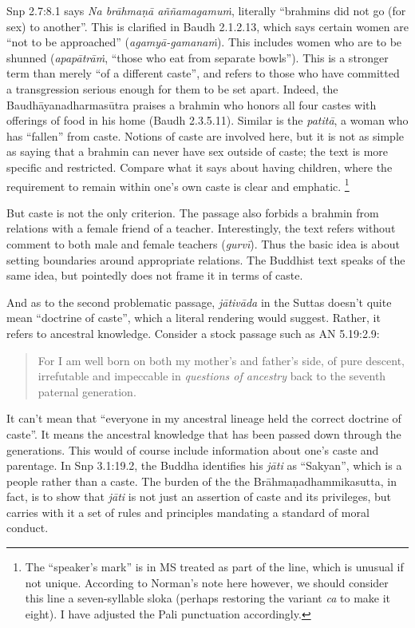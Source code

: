 \documentclass[12pt,openany]{book}%
\begin{document}
Snp 2.7:8.1 says \textit{Na \textsanskrit{brāhmaṇā} \textsanskrit{aññamagamuṁ}}, literally “brahmins did not go (for sex) to another”. This is clarified in Baudh 2.1.2.13, which says certain women are “not to be approached” (\textit{\textsanskrit{agamyā}-\textsanskrit{gamanaṁ}}). This includes women who are to be shunned (\textit{\textsanskrit{apapātrāṁ}}, “those who eat from separate bowls”). This is a stronger term than merely “of a different caste”, and refers to those who have committed a transgression serious enough for them to be set apart. Indeed, the \textsanskrit{Baudhāyanadharmasūtra} praises a brahmin who honors all four castes with offerings of food in his home (Baudh 2.3.5.11). Similar is the \textit{\textsanskrit{patitā}}, a woman who has “fallen” from caste. Notions of caste are involved here, but it is not as simple as saying that a brahmin can never have sex outside of caste; the text is more specific and restricted. Compare what it says about having children, where the requirement to remain within one’s own caste is clear and emphatic. \footnote{The “speaker’s mark” is in MS treated as part of the line, which is unusual if not unique. According to Norman’s note here however, we should consider this line a seven-syllable sloka (perhaps restoring the variant \textit{ca} to make it eight). I have adjusted the Pali punctuation accordingly. }

But caste is not the only criterion. The passage also forbids a brahmin from relations with a female friend of a teacher. Interestingly, the text refers without comment to both male and female teachers (\textit{\textsanskrit{gurvī}}). Thus the basic idea is about setting boundaries around appropriate relations. The Buddhist text speaks of the same idea, but pointedly does not frame it in terms of caste.

And as to the second problematic passage, \textit{\textsanskrit{jātivāda}} in the Suttas doesn’t quite mean “doctrine of caste”, which a literal rendering would suggest. Rather, it refers to ancestral knowledge. Consider a stock passage such as AN 5.19:2.9:

\begin{quotation}%
For I am well born on both my mother’s and father’s side, of pure descent, irrefutable and impeccable in \emph{questions of ancestry} back to the seventh paternal generation.

%
\end{quotation}

It can’t mean that “everyone in my ancestral lineage held the correct doctrine of caste”. It means the ancestral knowledge that has been passed down through the generations. This would of course include information about one’s caste and parentage. In Snp 3.1:19.2, the Buddha identifies his \textit{\textsanskrit{jāti}} as “Sakyan”, which is a people rather than a caste. The burden of the the \textsanskrit{Brāhmaṇadhammikasutta}, in fact, is to show that \textit{\textsanskrit{jāti}} is not just an assertion of caste and its privileges, but carries with it a set of rules and principles mandating a standard of moral conduct.
\end{document}
